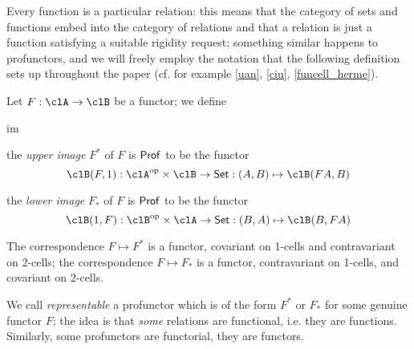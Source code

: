 Every function is a particular relation: this means that the category of sets and functions embed into the category of relations and that a relation is just a function satisfying a suitable rigidity request; something similar happens to profunctors, and we will freely employ the notation that the following definition sets up throughout the paper (cf. for example \autoref{uan}, \autoref{ciu}, \autoref{funcell_herme}).
\begin{definition}\label{upper_n_lower}
  Let $F : \clA \to \clB$ be a functor; we define 
  \begin{enumtag}{im}
    \item the \emph{upper image} $F^*$ of $F$ is $\mathsf{Prof}$ to be the functor 
    \[ \clB(F,1) : \clA^\op\times\clB \to\Set : (A,B)\mapsto \clB(FA,B) \]
    \item the \emph{lower image} $F_*$ of $F$ is $\mathsf{Prof}$ to be the functor 
    \[ \clB(1,F) : \clB^\op\times\clA \to\Set : (B,A)\mapsto \clB(B,FA) \]
  \end{enumtag}
  The correspondence $F\mapsto F^*$ is a functor, covariant on 1-cells and contravariant on 2-cells; the correspondence $F\mapsto F_*$ is a functor, contravariant on 1-cells, and covariant on 2-cells.

  We call \emph{representable} a profunctor which is of the form $F^*$ or $F_*$ for some genuine functor $F$; the idea is that \emph{some} relations are functional, i.e. they are functions. Similarly, some profunctors are functorial, they are functors.
\end{definition}
